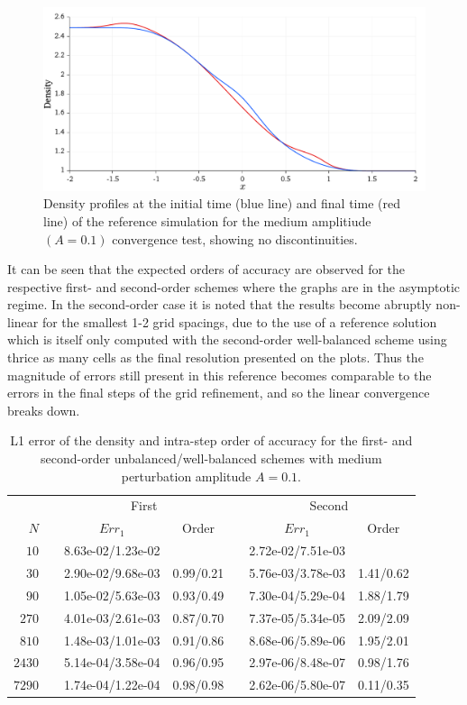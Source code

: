 \begin {figure}
\centering
\includegraphics[width=13cm]{figures/OVSeps0_1profile}
\caption {Density profiles at the initial time (blue line) and final time (red line) of the reference simulation for the medium amplitiude $(A=0.1)$ convergence test, showing no discontinuities.}
\label{fig:OVS_Amedium_profile}
\end{figure}

It can be seen that the expected orders of accuracy are observed for the respective first- and second-order schemes where the graphs are in the asymptotic regime. In the second-order case it is noted that the results become abruptly non-linear for the smallest 1-2 grid spacings, due to the use of a reference solution which is itself only computed with the second-order well-balanced scheme using thrice as many cells as the final resolution presented on the plots. Thus the magnitude of errors still present in this reference becomes comparable to the errors in the final steps of the grid refinement, and so the linear convergence breaks down.

\begin{table}\centering
\caption{L1 error of the density and intra-step order of accuracy for the first- and second-order unbalanced/well-balanced schemes with medium perturbation amplitude $A=0.1$.}
\label{table:OVS_Amedium}
\begin{tabular}{@{}rcccccc@{}}\toprule
& \phantom{a} & \multicolumn{2}{c}{First} & \phantom{ab} & \multicolumn{2}{c}{Second}\\
\cmidrule{3-4} \cmidrule{6-7}
$N$ && $Err_1$ & Order && $Err_1$ & Order\\ \midrule
$10$ && 8.63e-02/1.23e-02 &&& 2.72e-02/7.51e-03 &\\
$30$ && 2.90e-02/9.68e-03 & 0.99/0.21 && 5.76e-03/3.78e-03 & 1.41/0.62\\
$90$ && 1.05e-02/5.63e-03 & 0.93/0.49 && 7.30e-04/5.29e-04 & 1.88/1.79\\
$270$ && 4.01e-03/2.61e-03 & 0.87/0.70 && 7.37e-05/5.34e-05 & 2.09/2.09\\
$810$ && 1.48e-03/1.01e-03 & 0.91/0.86 && 8.68e-06/5.89e-06 & 1.95/2.01\\
$2430$ && 5.14e-04/3.58e-04 & 0.96/0.95 && 2.97e-06/8.48e-07 & 0.98/1.76\\
$7290$ && 1.74e-04/1.22e-04 & 0.98/0.98 && 2.62e-06/5.80e-07 & 0.11/0.35\\
\bottomrule
\end{tabular}
\end{table}

